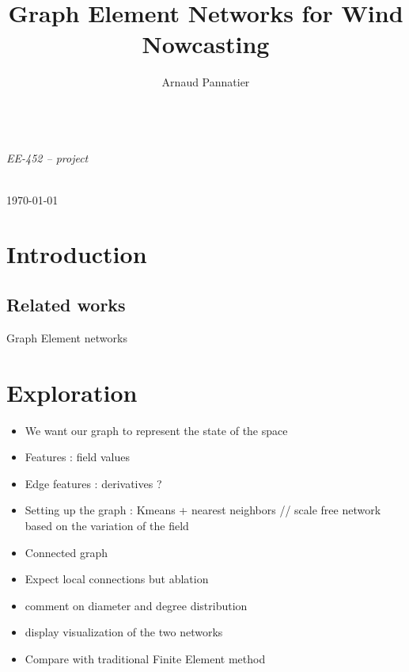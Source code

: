 \documentclass[a4paper,12pt]{article}
\title{Graph Element Networks for Wind Nowcasting}
\author{Arnaud Pannatier}
\begin{document}
\centering
\vspace*{0cm}
{\fontsize{35}{60}\selectfont \bfseries \thetitle } \\
\vspace{1cm}
\Large \textit{ EE-452 -- project} \\
\vspace{1cm}
\normalfont
\Large \theauthor \\
\vspace{0.5cm}

\scriptsize\today

\normalfont\normalsize

\justifying

\section{Introduction}

\subsection{Related works}

Graph Element networks \cite{alet19gen}

\section{Exploration}

\begin{itemize}
  \item We want our graph to represent the state of the space
  \item Features : field values
  \item Edge features : derivatives ?
  \item Setting up the graph : Kmeans + nearest neighbors // scale free network based on the variation of the field
  \item Connected graph
  \item Expect local connections but ablation
  \item comment on diameter and degree distribution
  \item display visualization of the two networks
  \item Compare with traditional Finite Element method
\end{itemize}
\end{document}
